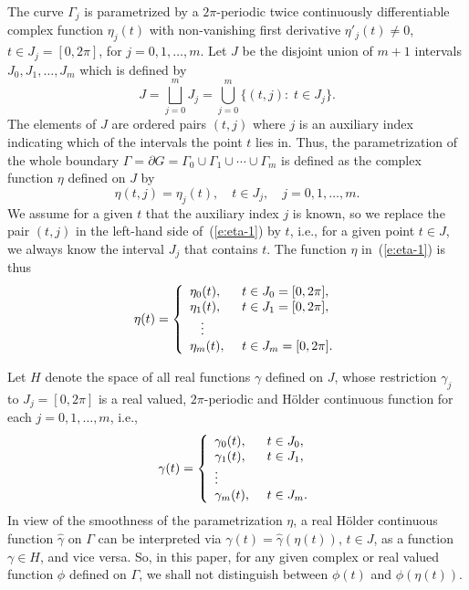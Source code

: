 \documentclass[11pt,a4paper]{article}
\begin{document}
The curve $\Gamma_j$ is parametrized by a $2\pi$-periodic twice continuously differentiable complex function $\eta_j(t)$ with non-vanishing first derivative $\eta'_j(t)\ne 0$, $t\in J_j=[0,2\pi]$, for $j=0,1,\ldots,m$. 
Let $J$ be the disjoint union of $m+1$ intervals $J_0,J_1,\ldots,J_m$ which is defined by 
\begin{equation}\label{e:J}
J = \bigsqcup_{j=0}^{m} J_j=\bigcup_{j=0}^{m}\{(t,j):\;t\in J_j\}.
\end{equation}
The elements of $J$ are ordered pairs $(t,j)$ where $j$ is an auxiliary index indicating which of the intervals the point $t$ lies in. Thus, the parametrization of the whole boundary $\Gamma=\partial G=\Gamma_0\cup\Gamma_1\cup\cdots\cup\Gamma_m$ is defined as the complex function $\eta$ defined on $J$ by
\begin{equation}\label{e:eta-1}
\eta(t,j)=\eta_j(t), \quad t\in J_j,\quad j=0,1,\ldots,m.
\end{equation}
We assume for a given $t$ that the auxiliary index $j$ is known, so we replace the pair $(t,j)$ in the left-hand side of~(\ref{e:eta-1}) by $t$, i.e., for a given point $t\in J$, we always know the interval $J_j$ that contains $t$. The function $\eta$ in~(\ref{e:eta-1}) is thus 
\begin{equation}\label{e:eta}
\eta(t)= \left\{ \begin{array}{l@{\hspace{0.5cm}}l}
\eta_{0}(t),&t\in J_{0}=[0,2\pi],\\
\eta_{1}(t),&t\in J_{1}=[0,2\pi],\\
\hspace{0.3cm}\vdots\\
\eta_m(t),&t\in J_m=[0,2\pi].
\end{array}
\right .
\end{equation}

Let $H$ denote the space of all real functions $\gamma$ defined on $J$, whose restriction $\gamma_j$ to $J_j=[0,2\pi]$ is a
real valued, $2\pi$-periodic and H\"older continuous function for each $j=0,1,\ldots,m$, i.e.,
\[
\gamma(t) = \left\{
\begin{array}{l@{\hspace{0.5cm}}l}
 \gamma_0(t),     & t\in J_0, \\
 \gamma_1(t),     & t\in J_1, \\
  \vdots       & \\
 \gamma_m(t),     & t\in J_m. \\
\end{array}%
\right.
\]
In view of the smoothness of the parametrization $\eta$, a real H\"older continuous function $\hat\gamma$ on $\Gamma$ can be interpreted via $\gamma(t)=\hat\gamma(\eta(t))$, $t\in J$, as a function $\gamma\in H$, and vice versa. So, in this paper, for any given complex or real valued function $\phi$ defined on $\Gamma$, we shall not distinguish between $\phi(t)$ and $\phi(\eta(t))$. 
\end{document}
